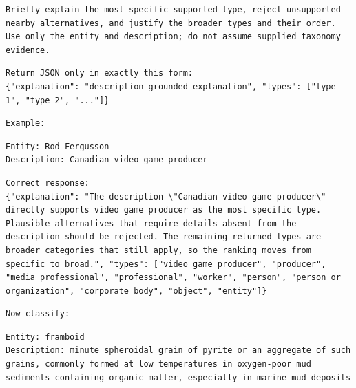 \begin{Verbatim}[fontsize=\footnotesize,breaklines=true,breakanywhere=true]
Briefly explain the most specific supported type, reject unsupported nearby alternatives, and justify the broader types and their order. Use only the entity and description; do not assume supplied taxonomy evidence.
\end{Verbatim}

\begin{Verbatim}[fontsize=\footnotesize,breaklines=true,breakanywhere=true]
Return JSON only in exactly this form:
{"explanation": "description-grounded explanation", "types": ["type 1", "type 2", "..."]}
\end{Verbatim}

\begin{Verbatim}[fontsize=\footnotesize,breaklines=true,breakanywhere=true]
Example:
\end{Verbatim}

\begin{Verbatim}[fontsize=\footnotesize,breaklines=true,breakanywhere=true]
Entity: Rod Fergusson
Description: Canadian video game producer
\end{Verbatim}

\begin{Verbatim}[fontsize=\footnotesize,breaklines=true,breakanywhere=true]
Correct response:
{"explanation": "The description \"Canadian video game producer\" directly supports video game producer as the most specific type. Plausible alternatives that require details absent from the description should be rejected. The remaining returned types are broader categories that still apply, so the ranking moves from specific to broad.", "types": ["video game producer", "producer", "media professional", "professional", "worker", "person", "person or organization", "corporate body", "object", "entity"]}
\end{Verbatim}

\begin{Verbatim}[fontsize=\footnotesize,breaklines=true,breakanywhere=true]
Now classify:
\end{Verbatim}

\begin{Verbatim}[fontsize=\footnotesize,breaklines=true,breakanywhere=true]
Entity: framboid
Description: minute spheroidal grain of pyrite or an aggregate of such grains, commonly formed at low temperatures in oxygen-poor mud sediments containing organic matter, especially in marine mud deposits
\end{Verbatim}


